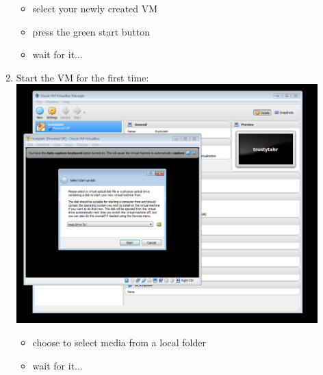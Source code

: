 \documentclass[12pt]{article}
\begin{document}
\begin{description}
\begin{enumerate}
\begin{itemize}
                 \item select your newly created VM      
                 \item press the green start button
                 \item wait for it...       
            \end{itemize}
	\newpage
\item Start the VM for the first time: \vspace{20mm} \\
      		\hspace*{-2.5cm}\includegraphics[scale=.6]{Capture8.png}\\
            \begin{itemize}
                    
                 \item choose to select media from a local folder 
                 \item wait for it...
                 
            \end{itemize}
	

\end{enumerate}
\end{description}
\end{document}
